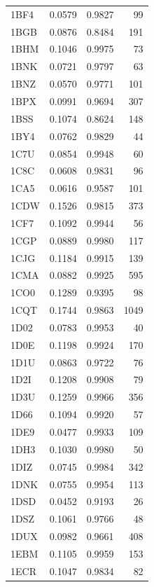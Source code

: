 \begin{longtable}{lrrr}
        1BF4 & 0.0579 & 0.9827 & 99 \\
        1BGB & 0.0876 & 0.8484 & 191 \\
        1BHM & 0.1046 & 0.9975 & 73 \\
        1BNK & 0.0721 & 0.9797 & 63 \\
        1BNZ & 0.0570 & 0.9771 & 101 \\
        1BPX & 0.0991 & 0.9694 & 307 \\
        1BSS & 0.1074 & 0.8624 & 148 \\
        1BY4 & 0.0762 & 0.9829 & 44 \\
        1C7U & 0.0854 & 0.9948 & 60 \\
        1C8C & 0.0608 & 0.9831 & 96 \\
        1CA5 & 0.0616 & 0.9587 & 101 \\
        1CDW & 0.1526 & 0.9815 & 373 \\
        1CF7 & 0.1092 & 0.9944 & 56 \\
        1CGP & 0.0889 & 0.9980 & 117 \\
        1CJG & 0.1184 & 0.9915 & 139 \\
        1CMA & 0.0882 & 0.9925 & 595 \\
        1CO0 & 0.1289 & 0.9395 & 98 \\
        1CQT & 0.1744 & 0.9863 & 1049 \\
        1D02 & 0.0783 & 0.9953 & 40 \\
        1D0E & 0.1198 & 0.9924 & 170 \\
        1D1U & 0.0863 & 0.9722 & 76 \\
        1D2I & 0.1208 & 0.9908 & 79 \\
        1D3U & 0.1259 & 0.9966 & 356 \\
        1D66 & 0.1094 & 0.9920 & 57 \\
        1DE9 & 0.0477 & 0.9933 & 109 \\
        1DH3 & 0.1030 & 0.9980 & 50 \\
        1DIZ & 0.0745 & 0.9984 & 342 \\
        1DNK & 0.0755 & 0.9954 & 113 \\
        1DSD & 0.0452 & 0.9193 & 26 \\
        1DSZ & 0.1061 & 0.9766 & 48 \\
        1DUX & 0.0982 & 0.9661 & 408 \\
        1EBM & 0.1105 & 0.9959 & 153 \\
        1ECR & 0.1047 & 0.9834 & 82 \\

\end{longtable}
